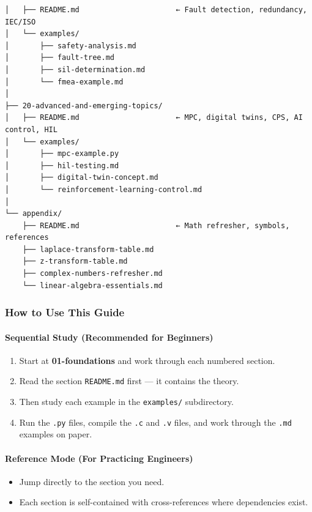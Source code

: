 \documentclass[11pt,a4paper]{book}
\begin{document}
\begin{lstlisting}
│   ├── README.md                      ← Fault detection, redundancy, IEC/ISO
│   └── examples/
│       ├── safety-analysis.md
│       ├── fault-tree.md
│       ├── sil-determination.md
│       └── fmea-example.md
│
├── 20-advanced-and-emerging-topics/
│   ├── README.md                      ← MPC, digital twins, CPS, AI control, HIL
│   └── examples/
│       ├── mpc-example.py
│       ├── hil-testing.md
│       ├── digital-twin-concept.md
│       └── reinforcement-learning-control.md
│
└── appendix/
    ├── README.md                      ← Math refresher, symbols, references
    ├── laplace-transform-table.md
    ├── z-transform-table.md
    ├── complex-numbers-refresher.md
    └── linear-algebra-essentials.md
\end{lstlisting}

\medskip\noindent\hrulefill\medskip

\subsubsection{How to Use This Guide}

\paragraph{Sequential Study (Recommended for Beginners)}
\begin{enumerate}
\item Start at \textbf{01-foundations} and work through each numbered section.
\item Read the section \texttt{README.md} first — it contains the theory.
\item Then study each example in the \texttt{examples/} subdirectory.
\item Run the \texttt{.py} files, compile the \texttt{.c} and \texttt{.v} files, and work through the \texttt{.md} examples on paper.
\end{enumerate}

\paragraph{Reference Mode (For Practicing Engineers)}
\begin{itemize}
\item Jump directly to the section you need.
\item Each section is self-contained with cross-references where dependencies exist.
\end{itemize}
\end{document}
